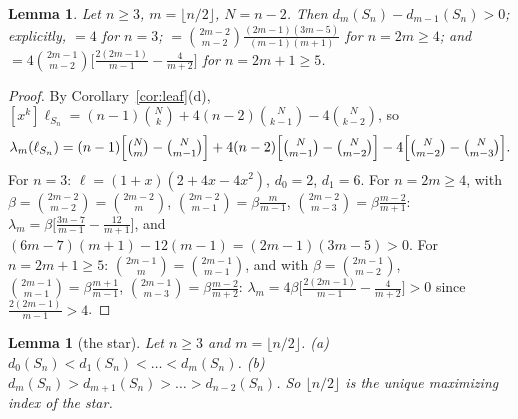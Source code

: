 \documentclass[11pt]{amsart}
\newtheorem{lemma}[theorem]{Lemma}
\theoremstyle{definition}
\theoremstyle{remark}
\begin{document}
\begin{lemma}\label{lem:starvalue}
Let $n\ge3$, $m=\lfloor n/2\rfloor$, $N=n-2$. Then
$d_m(S_n)-d_{m-1}(S_n)>0$; explicitly, $=4$ for $n=3$;
$=\binom{2m-2}{m-2}\frac{(2m-1)(3m-5)}{(m-1)(m+1)}$ for $n=2m\ge4$; and
$=4\binom{2m-1}{m-2}\bigl[\frac{2(2m-1)}{m-1}-\frac4{m+2}\bigr]$ for $n=2m+1\ge5$.
\end{lemma}

\begin{proof}
By Corollary~\ref{cor:leaf}(d),
$[x^k]\ell_{S_n}=(n-1)\binom Nk+4(n-2)\binom N{k-1}-4\binom N{k-2}$, so
\[
\lambda_m(\ell_{S_n})=(n-1)\Bigl[\tbinom Nm-\tbinom N{m-1}\Bigr]+4(n-2)\Bigl[\tbinom N{m-1}-\tbinom N{m-2}\Bigr]-4\Bigl[\tbinom N{m-2}-\tbinom N{m-3}\Bigr].
\]
For $n=3$: $\ell=(1+x)(2+4x-4x^2)$, $d_0=2$, $d_1=6$. For $n=2m\ge4$, with
$\beta=\binom{2m-2}{m-2}=\binom{2m-2}{m}$, $\binom{2m-2}{m-1}=\beta\frac m{m-1}$,
$\binom{2m-2}{m-3}=\beta\frac{m-2}{m+1}$:
$\lambda_m=\beta\bigl[\frac{3n-7}{m-1}-\frac{12}{m+1}\bigr]$, and
$(6m-7)(m+1)-12(m-1)=(2m-1)(3m-5)>0$. For $n=2m+1\ge5$:
$\binom{2m-1}m=\binom{2m-1}{m-1}$, and with $\beta=\binom{2m-1}{m-2}$,
$\binom{2m-1}{m-1}=\beta\frac{m+1}{m-1}$, $\binom{2m-1}{m-3}=\beta\frac{m-2}{m+2}$:
$\lambda_m=4\beta\bigl[\frac{2(2m-1)}{m-1}-\frac4{m+2}\bigr]>0$ since
$\frac{2(2m-1)}{m-1}>4$.
\end{proof}

\begin{lemma}[the star]\label{lem:starshape}
Let $n\ge3$ and $m=\lfloor n/2\rfloor$. \textup{(a)}
$d_0(S_n)<d_1(S_n)<\dots<d_m(S_n)$. \textup{(b)}
$d_m(S_n)>d_{m+1}(S_n)>\dots>d_{n-2}(S_n)$. So $\lfloor n/2\rfloor$ is the
unique maximizing index of the star.
\end{lemma}
\end{document}
